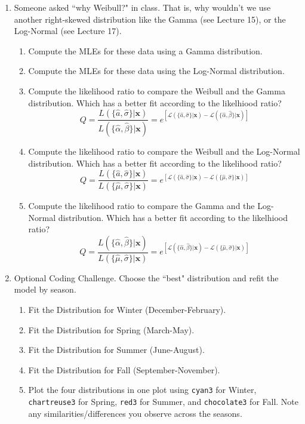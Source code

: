 \documentclass{article}\usepackage[]{graphicx}\usepackage[]{xcolor}
\begin{document}
\begin{enumerate}
  \item Someone asked ``why Weibull?" in class. That is, why wouldn't we use 
  another right-skewed distribution like the Gamma (see Lecture 15), or
  the Log-Normal (see Lecture 17).
  \begin{enumerate}
    \item Compute the MLEs for these data using a Gamma distribution. 
    \item Compute the MLEs for these data using the Log-Normal distribution.
    \item Compute the likelihood ratio to compare the Weibull and the Gamma distribution. 
    Which has a better fit according to the likelhiood ratio?
    \[Q = \frac{L(\{\hat{a}, \hat{\sigma}\}|\mathbf{x})}{L(\{\hat{\alpha}, \hat{\beta}\}|\mathbf{x})}=e^{\left[\mathcal{L}(\{\hat{a}, \hat{\sigma}\}|\mathbf{x}) - \mathcal{L}(\{\hat{\alpha}, \hat{\beta}\}|\mathbf{x})\right]}\]
    \item Compute the likelihood ratio to compare the Weibull and the Log-Normal distribution.
    Which has a better fit according to the likelihood ratio?
    \[Q = \frac{L(\{\hat{a}, \hat{\sigma}\}|\mathbf{x})}{L(\{\hat{\mu}, \hat{\sigma}\}|\mathbf{x})}=e^{\left[\mathcal{L}(\{\hat{a}, \hat{\sigma}\}|\mathbf{x}) - \mathcal{L}(\{\hat{\mu}, \hat{\sigma}\}|\mathbf{x})\right]}\]
    \item Compute the likelihood ratio to compare the Gamma and the Log-Normal distribution.
    Which has a better fit according to the likelhiood ratio?
    \[Q = \frac{L(\{\hat{\alpha}, \hat{\beta}\}|\mathbf{x})}{L(\{\hat{\mu}, \hat{\sigma}\}|\mathbf{x})}=e^{\left[\mathcal{L}(\{\hat{\alpha}, \hat{\beta}\}|\mathbf{x}) - \mathcal{L}(\{\hat{\mu}, \hat{\sigma}\}|\mathbf{x})\right]}\]
  \end{enumerate}
  \item Optional Coding Challenge. Choose the ``best" distribution and refit the
  model by season.
  \begin{enumerate}
    \item Fit the Distribution for Winter (December-February).
    \item Fit the Distribution for Spring (March-May).
    \item Fit the Distribution for Summer (June-August).
    \item Fit the Distribution for Fall (September-November).
    \item Plot the four distributions in one plot using \texttt{cyan3} for Winter,
    \texttt{chartreuse3} for Spring, \texttt{red3} for Summer, and \texttt{chocolate3}
    for Fall. Note any similarities/differences you observe across the seasons.
  \end{enumerate}
\end{enumerate}
\end{document}
